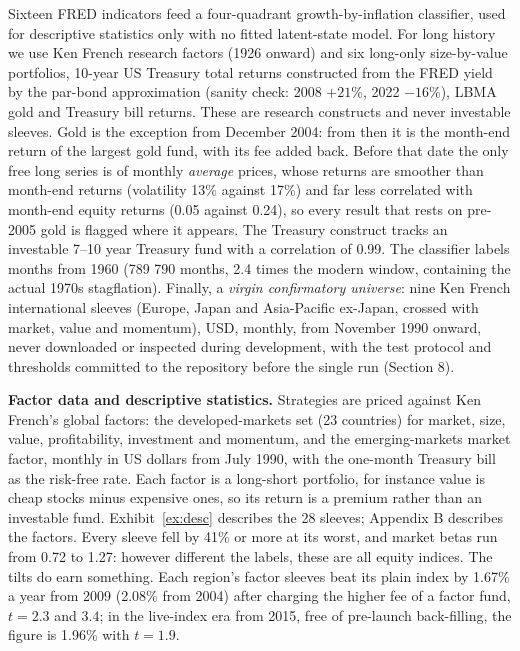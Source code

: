 \documentclass[12pt,letterpaper]{article}
\newcommand{\quita}[1]{{\color{quitarc}#1}}
\newcommand{\nuevo}[1]{{\color{nuevoc}#1}}
\newenvironment{nuevotexto}{\par\color{nuevoc}}{\par}
\newcommand{\head}[1]{\noindent\textbf{#1}\hspace{0.5em}\ignorespaces}
\begin{document}
Sixteen FRED indicators feed a four-quadrant growth-by-inflation classifier, used
for descriptive statistics only with no fitted latent-state model. For long
history we use Ken French research factors (1926 onward) and six long-only
size-by-value portfolios, 10-year US Treasury total returns constructed from the
FRED yield by the \citet{swinkels2019} par-bond approximation (sanity check: 2008
$+21$\%, 2022 $-16$\%), \quita{LBMA} gold and Treasury bill returns. These are research
constructs and never investable sleeves.\nuevo{ Gold is the exception from December 2004: from then
it is the month-end return of the largest gold fund, with its fee added back. Before that date the
only free long series is of monthly \emph{average} prices, whose returns are smoother than month-end
returns (volatility 13\% against 17\%) and far less correlated with month-end equity returns (0.05
against 0.24), so every result that rests on pre-2005 gold is flagged where it appears. The Treasury
construct tracks an investable 7--10 year Treasury fund with a correlation of 0.99.} The classifier labels months from 1960
(\quita{789} \nuevo{790} months, 2.4 times the modern window, containing the actual 1970s
stagflation). Finally, a \emph{virgin confirmatory universe}: nine Ken French
international sleeves (Europe, Japan and Asia-Pacific ex-Japan, crossed with
market, value and momentum), USD, monthly, from November 1990 onward, never
downloaded or inspected during development, with the test protocol and thresholds
committed to the repository before the single run (Section 8).

\begin{nuevotexto}
\head{Factor data and descriptive statistics.} Strategies are priced against Ken French's
global factors: the developed-markets set (23 countries) for market, size, value,
profitability, investment and momentum, and the emerging-markets market factor, monthly in US
dollars from July 1990, with the one-month Treasury bill as the risk-free rate. Each factor is a
long-short portfolio, for instance value is cheap stocks minus expensive ones, so its return is
a premium rather than an investable fund. Exhibit~\ref{ex:desc} describes the 28 sleeves;
Appendix B describes the factors. Every sleeve fell by 41\% or more at its worst, and market betas
run from 0.72 to 1.27: however different the labels, these are all equity indices. The tilts do earn
something. Each region's factor sleeves beat its plain index by 1.67\% a year from 2009 (2.08\% from
2004) after charging the higher fee of a factor fund, $t = 2.3$ and $3.4$; in the live-index era from
2015, free of pre-launch back-filling, the figure is 1.96\% with $t = 1.9$.
\end{nuevotexto}
\end{document}
